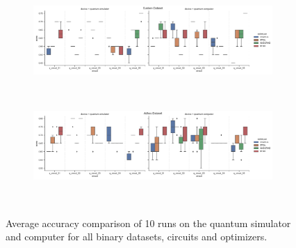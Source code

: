 \begin{figure}[!ht]
\begin{subfigure}{1.0\textwidth}
        \centering
        \includegraphics[width=1.0\linewidth]{thesis/Figures/qnn/boxplots/100_custom.png}
        \label{subfigure:accuracy_comparison_boxplots_custom_dataset1}
    \end{subfigure}
    \\[-3ex]
    \begin{subfigure}{1.0\textwidth}
        \centering
        \includegraphics[width=1.0\linewidth]{thesis/Figures/qnn/boxplots/100_adhoc.png}
        \label{subfigure:accuracy_comparison_boxplots_adhoc_dataset1}
    \end{subfigure}
    \\[-3ex]
    \caption{Average accuracy comparison of 10 runs on the quantum simulator and computer for all binary datasets, circuits and optimizers.}
    \label{figure:accuracy_comparison_boxplots_binary_datasets}
\end{figure}


\clearpage